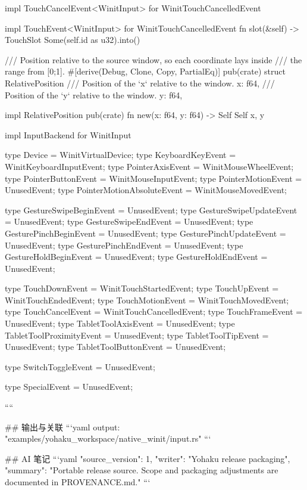 impl TouchCancelEvent<WinitInput> for WinitTouchCancelledEvent {}

impl TouchEvent<WinitInput> for WinitTouchCancelledEvent {
    fn slot(&self) -> TouchSlot {
        Some(self.id as u32).into()
    }
}

/// Position relative to the source window, so each coordinate lays inside
/// the range from [0;1].
#[derive(Debug, Clone, Copy, PartialEq)]
pub(crate) struct RelativePosition {
    /// Position of the `x` relative to the window.
    x: f64,
    /// Position of the `y` relative to the window.
    y: f64,
}

impl RelativePosition {
    pub(crate) fn new(x: f64, y: f64) -> Self {
        Self { x, y }
    }
}

impl InputBackend for WinitInput {
    type Device = WinitVirtualDevice;
    type KeyboardKeyEvent = WinitKeyboardInputEvent;
    type PointerAxisEvent = WinitMouseWheelEvent;
    type PointerButtonEvent = WinitMouseInputEvent;
    type PointerMotionEvent = UnusedEvent;
    type PointerMotionAbsoluteEvent = WinitMouseMovedEvent;

    type GestureSwipeBeginEvent = UnusedEvent;
    type GestureSwipeUpdateEvent = UnusedEvent;
    type GestureSwipeEndEvent = UnusedEvent;
    type GesturePinchBeginEvent = UnusedEvent;
    type GesturePinchUpdateEvent = UnusedEvent;
    type GesturePinchEndEvent = UnusedEvent;
    type GestureHoldBeginEvent = UnusedEvent;
    type GestureHoldEndEvent = UnusedEvent;

    type TouchDownEvent = WinitTouchStartedEvent;
    type TouchUpEvent = WinitTouchEndedEvent;
    type TouchMotionEvent = WinitTouchMovedEvent;
    type TouchCancelEvent = WinitTouchCancelledEvent;
    type TouchFrameEvent = UnusedEvent;
    type TabletToolAxisEvent = UnusedEvent;
    type TabletToolProximityEvent = UnusedEvent;
    type TabletToolTipEvent = UnusedEvent;
    type TabletToolButtonEvent = UnusedEvent;

    type SwitchToggleEvent = UnusedEvent;

    type SpecialEvent = UnusedEvent;
}
````

## 输出与关联
```yaml
output: "examples/yohaku_workspace/native_winit/input.rs"
```

## AI 笔记
```yaml
{"source_version": 1, "writer": "Yohaku release packaging", "summary": "Portable release source. Scope and packaging adjustments are documented in PROVENANCE.md."}
```
